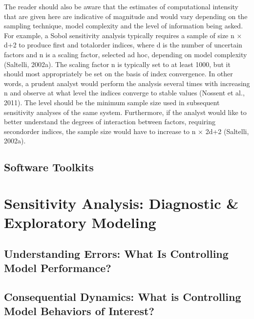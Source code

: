 \documentclass[letterpaper,10pt,english]{sphinxmanual}
\begin{document}
\sphinxAtStartPar
The reader should also be aware that the estimates of computational intensity that are given here are indicative of magnitude and would vary depending on the sampling technique, model complexity and the level of information being asked. For example, a Sobol sensitivity analysis typically requires a sample of size n × d+2 to produce first\sphinxhyphen{} and total\sphinxhyphen{}order indices, where d is the number of uncertain factors and n is a scaling factor, selected ad hoc, depending on model complexity (Saltelli, 2002a). The scaling factor n is typically set to at least 1000, but it should most appropriately be set on the basis of index convergence. In other words, a prudent analyst would perform the analysis several times with increasing n and observe at what level the indices converge to stable values (Nossent et al., 2011). The level should be the minimum sample size used in subsequent sensitivity analyses of the same system. Furthermore, if the analyst would like to better understand the degrees of interaction between factors, requiring second\sphinxhyphen{}order indices, the sample size would have to increase to n × 2d+2 (Saltelli, 2002a).


\section{Software Toolkits}
\label{\detokenize{3_sensitivity_analysis_the_basics:software-toolkits}}

\chapter{Sensitivity Analysis: Diagnostic \& Exploratory Modeling}
\label{\detokenize{4_sensitivity_analysis_diagnostic_and_exploratory_modeling:sensitivity-analysis-diagnostic-exploratory-modeling}}\label{\detokenize{4_sensitivity_analysis_diagnostic_and_exploratory_modeling::doc}}

\section{Understanding Errors: What Is Controlling Model Performance?}
\label{\detokenize{4_sensitivity_analysis_diagnostic_and_exploratory_modeling:understanding-errors-what-is-controlling-model-performance}}

\section{Consequential Dynamics: What is Controlling Model Behaviors of Interest?}
\label{\detokenize{4_sensitivity_analysis_diagnostic_and_exploratory_modeling:consequential-dynamics-what-is-controlling-model-behaviors-of-interest}}
\end{document}
